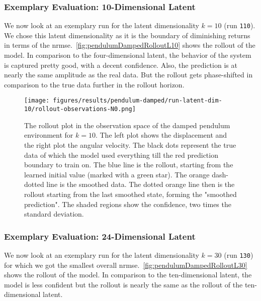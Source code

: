 		\subsubsection{Exemplary Evaluation: 10-Dimensional Latent}
			\label{subsubsec:pendulumDampedL10}

			We now look at an exemplary run for the latent dimensionality \( k = 10 \) (run \texttt{110}). We chose this latent dimensionality as it is the boundary of diminishing returns in terms of the \ac{nrmse}.~\autoref{fig:pendulumDampedRolloutL10} shows the rollout of the model. In comparison to the four-dimensional latent, the behavior of the system is captured pretty good, with a decent confidence. Also, the prediction is at nearly the same amplitude as the real data. But the rollout gets phase-shifted in comparison to the true data further in the rollout horizon.

			\begin{figure}
				\centering
				\texttt{[image: figures/results/pendulum-damped/run-latent-dim-10/rollout-observations-N0.png]}
				\caption[Rollout of the damped pendulum experiment for 10 latent dimensions]{The rollout plot in the observation space of the damped pendulum environment for \(k = 10\). The left plot shows the displacement and the right plot the angular velocity. The black dots represent the true data of which the model used everything till the red prediction boundary to train on. The blue line is the rollout, starting from the learned initial value (marked with a green star). The orange dash-dotted line is the smoothed data. The dotted orange line then is the rollout starting from the last smoothed state, forming the "smoothed prediction". The shaded regions show the confidence, \ie two times the standard deviation.}
				\label{fig:pendulumDampedRolloutL10}
			\end{figure}

		\subsubsection{Exemplary Evaluation: 24-Dimensional Latent}
			We now look at an exemplary run for the latent dimensionality \( k = 30 \) (run \texttt{130}) for which we got the smallest overall \ac{nrmse}.~\autoref{fig:pendulumDampedRolloutL30} shows the rollout of the model. In comparison to the ten-dimensional latent, the model is less confident but the rollout is nearly the same as the rollout of the ten-dimensional latent.

